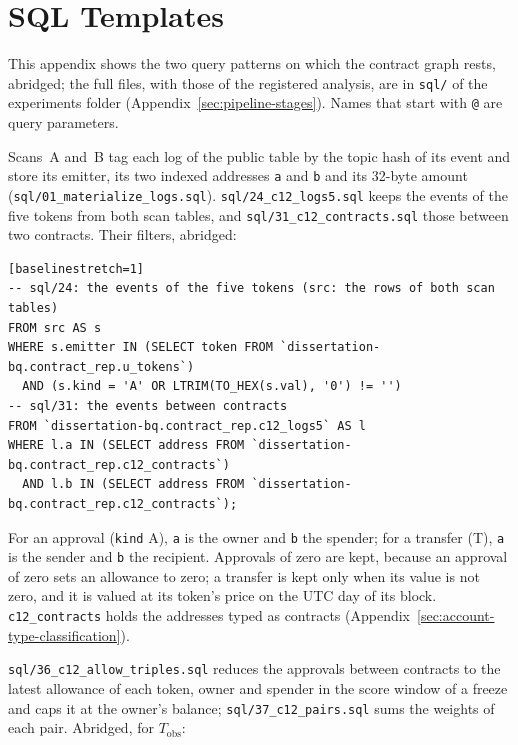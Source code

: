 \section{SQL Templates}
\label{ch:appendix-sql}

This appendix shows the two query patterns on which the contract graph rests, abridged; the full files, with those of the registered analysis, are in \texttt{sql/} of the experiments folder (Appendix~\ref{sec:pipeline-stages}). Names that start with \texttt{@} are query parameters.


Scans~A and~B tag each log of the public table by the topic hash of its event and store its emitter, its two indexed addresses \texttt{a} and \texttt{b} and its 32-byte amount (\texttt{sql/01\_materialize\_logs.sql}). \texttt{sql/24\_c12\_logs5.sql} keeps the events of the five tokens from both scan tables, and \texttt{sql/31\_c12\_contracts.sql} those between two contracts. Their filters, abridged:

\begin{verbatim}[baselinestretch=1]
-- sql/24: the events of the five tokens (src: the rows of both scan tables)
FROM src AS s
WHERE s.emitter IN (SELECT token FROM `dissertation-bq.contract_rep.u_tokens`)
  AND (s.kind = 'A' OR LTRIM(TO_HEX(s.val), '0') != '')
-- sql/31: the events between contracts
FROM `dissertation-bq.contract_rep.c12_logs5` AS l
WHERE l.a IN (SELECT address FROM `dissertation-bq.contract_rep.c12_contracts`)
  AND l.b IN (SELECT address FROM `dissertation-bq.contract_rep.c12_contracts`);
\end{verbatim}

For an approval (\texttt{kind} A), \texttt{a} is the owner and \texttt{b} the spender; for a transfer (T), \texttt{a} is the sender and \texttt{b} the recipient. Approvals of zero are kept, because an approval of zero sets an allowance to zero; a transfer is kept only when its value is not zero, and it is valued at its token's price on the UTC day of its block. \texttt{c12\_contracts} holds the addresses typed as contracts (Appendix~\ref{sec:account-type-classification}).


\texttt{sql/36\_c12\_allow\_triples.sql} reduces the approvals between contracts to the latest allowance of each token, owner and spender in the score window of a freeze and caps it at the owner's balance; \texttt{sql/37\_c12\_pairs.sql} sums the weights of each pair. Abridged, for $T_{\mathrm{obs}}$:

